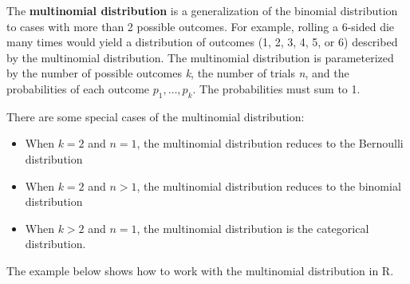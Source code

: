 \documentclass[
  13,
  letterpaper,
]{report}
\providecommand{\tightlist}{%
  \setlength{\itemsep}{0pt}\setlength{\parskip}{0pt}}
\begin{document}
The \textbf{multinomial distribution} is a generalization of the
binomial distribution to cases with more than 2 possible outcomes. For
example, rolling a 6-sided die many times would yield a distribution of
outcomes (1, 2, 3, 4, 5, or 6) described by the multinomial
distribution. The multinomial distribution is parameterized by the
number of possible outcomes \emph{k}, the number of trials \emph{n}, and
the probabilities of each outcome \(p_1, \ldots, p_k\). The
probabilities must sum to 1.

There are some special cases of the multinomial distribution:

\begin{itemize}
\tightlist
\item
  When \(k=2\) and \(n=1\), the multinomial distribution reduces to the
  Bernoulli distribution
\item
  When \(k=2\) and \(n>1\), the multinomial distribution reduces to the
  binomial distribution
\item
  When \(k>2\) and \(n=1\), the multinomial distribution is the
  categorical distribution.
\end{itemize}

The example below shows how to work with the multinomial distribution in
R.
\end{document}

